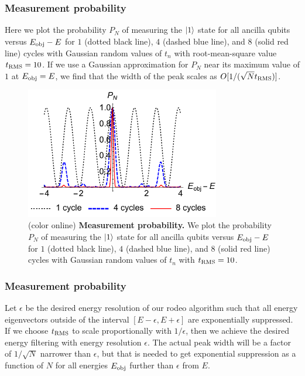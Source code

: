 \documentclass{beamer}
\begin{document}
\begin{frame}
\frametitle{Measurement probability}
Here we plot the probability $P_N$ of measuring the $\ket{1}$ state for all ancilla qubits versus $E_{\rm obj}-E$ for $1$ (dotted black line), $4$ (dashed blue line), and $8$ (solid red line) cycles with Gaussian random values of $t_n$ with root-mean-square value $t_{\rm RMS}=10$.  If we use a Gaussian approximation for $P_N$ near its maximum value of $1$ at $E_{\rm obj}=E$, we find that the width of the peak scales as $O[1/(\sqrt{N}t_{\rm RMS})]$.
\begin{figure}
\centering
\includegraphics[width=8.5cm]{rodeofigs/rodeo_probability.pdf}
\caption{(color online) {\bf Measurement probability.} We plot the probability $P_N$ of measuring the $\ket{1}$ state for all ancilla qubits versus $E_{\rm obj}-E$ for $1$ (dotted black line), $4$ (dashed blue line), and $8$ (solid red line) cycles with Gaussian random values of $t_n$ with $t_{\rm RMS}=10$.}
\label{rodeo_probability}
\end{figure} 

\end{frame}


\begin{frame}
\frametitle{Measurement probability}
Let $\epsilon$ be the desired energy resolution of our rodeo algorithm such that all energy eigenvectors outside of the interval $[E-\epsilon, E+\epsilon]$ are exponentially suppressed.  If we choose $t_{\rm RMS}$ to scale proportionally with $1/\epsilon$, then we achieve the desired energy filtering with energy resolution $\epsilon$.  The actual peak width will be a factor of $1/\sqrt{N}$ narrower than $\epsilon$, but that is needed to get exponential suppression as a function of $N$ for all energies $E_{\rm obj}$ further than $\epsilon$ from $E$. 
\end{frame}
\end{document}
